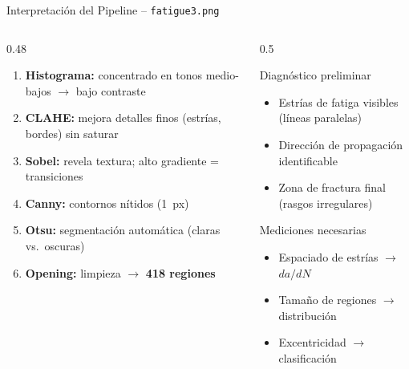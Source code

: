 \documentclass[aspectratio=169,12pt]{beamer}
\begin{document}
\begin{frame}{Interpretación del Pipeline -- \texttt{fatigue3.png}}
	\begin{columns}
		\begin{column}{0.48\textwidth}
			\begin{enumerate}\scriptsize
				\item \textbf{Histograma:} concentrado en tonos
				      medio-bajos $\to$ bajo contraste
				\item \textbf{CLAHE:} mejora detalles finos
				      (estrías, bordes) sin saturar
				\item \textbf{Sobel:} revela textura;
				      alto gradiente = transiciones
				\item \textbf{Canny:} contornos nítidos (1~px)
				\item \textbf{Otsu:} segmentación automática
				      (claras vs.\ oscuras)
				\item \textbf{Opening:} limpieza $\to$
				      \textbf{418 regiones}
			\end{enumerate}
		\end{column}
		\begin{column}{0.5\textwidth}
			\begin{block}{Diagnóstico preliminar}
				\scriptsize
				\begin{itemize}
					\item Estrías de fatiga visibles (líneas
					      paralelas)
					\item Dirección de propagación identificable
					\item Zona de fractura final (rasgos irregulares)
				\end{itemize}
			\end{block}

			\vspace{0.2em}
			\begin{exampleblock}{Mediciones necesarias}
				\scriptsize
				\begin{itemize}
					\item Espaciado de estrías $\to$ $da/dN$
					\item Tamaño de regiones $\to$ distribución
					\item Excentricidad $\to$ clasificación
				\end{itemize}
			\end{exampleblock}
		\end{column}
	\end{columns}
\end{frame}
\end{document}
